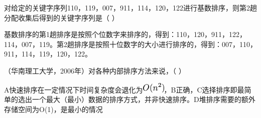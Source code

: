 \question 对给定的关键字序列110，119，007，911，114，120，122进行基数排序，则第2趟分配收集后得到的关键字序列是（
）
\par{}
\begin{solution}基数排序的第1趟排序是按照个位数字来排序的，得到：110，120，911，122，114，007，119。第2趟排序是按照十位数字的大小进行排序的，得到：007，110，911，114，119，120，122。
\end{solution}
\question （华南理工大学，2006年）对各种内部排序方法来说，（ ）
\par{}
\begin{solution}A快速排序在一定情况下时间复杂度会退化为\includegraphics[width=0.43750in,height=0.19792in]{texmath/ead2f65Cdpi7B3507DO28n5E229}，B正确，C选择排序即最简单的选出一个最大（最小）数据的排序方式，并非快速排序。D堆排序需要的额外存储空间为O(1)，是最小的情况
\end{solution}
